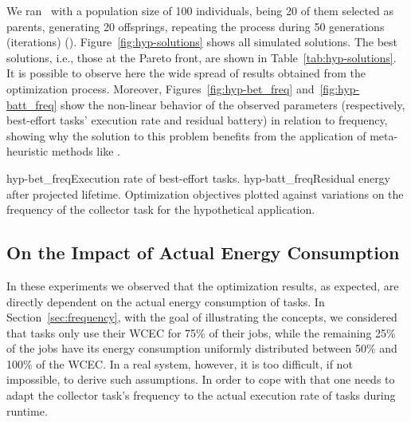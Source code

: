 

We ran \nsga~with a population size of 100 individuals, being 20 of them
selected as parents, generating 20 offsprings, repeating the process during 50
generations (iterations) (\nsgaparam).
Figure~\ref{fig:hyp-solutions} shows all simulated solutions. The best
solutions, i.e., those at the Pareto front, are shown in
Table~\ref{tab:hyp-solutions}. It is possible to observe here the wide spread
of results obtained from the optimization process. Moreover,
Figures~\ref{fig:hyp-bet_freq} and~\ref{fig:hyp-batt_freq} show the non-linear
behavior of the observed parameters (respectively, best-effort tasks' execution
rate and residual battery) in relation to frequency, showing why the solution to
this problem benefits from the application of meta-heuristic methods like \nsga.

\figtwo
{hyp-bet_freq}{Execution rate of best-effort tasks.}
{hyp-batt_freq}{Residual energy after projected lifetime.}
{Optimization objectives plotted against variations on the frequency of the
collector task for the hypothetical application.}


\subsection{On the Impact of Actual Energy Consumption}
\label{sec:wcet_impact}

In these experiments we observed that the optimization results, as expected, are
directly dependent on the actual energy consumption of tasks. In
Section~\ref{sec:frequency}, with the goal of illustrating the concepts, we
considered that tasks only use their WCEC for 75\% of their jobs, while the
remaining 25\% of the jobs have its energy consumption uniformly distributed
between 50\% and 100\% of the WCEC. In a real system, however, it is too
difficult, if not impossible, to derive such assumptions. In order to cope with
that one needs to adapt the collector task's frequency to the actual execution
rate of tasks during runtime.


